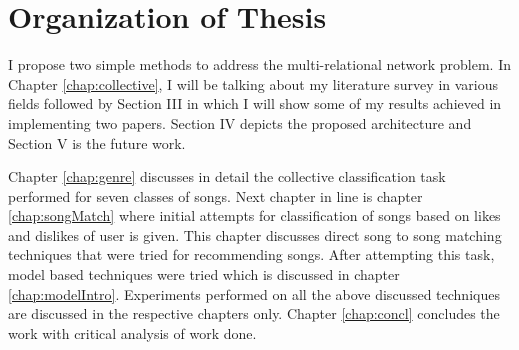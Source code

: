 \section{Organization of Thesis}
I propose two simple methods to address the multi-relational network problem. In Chapter \ref{chap:collective}, I will be talking about my literature survey in various fields followed by Section III in which I will show some of my results achieved in implementing two papers. Section IV depicts the proposed architecture and Section V is the future work.

Chapter \ref{chap:genre} discusses in detail the collective classification task performed for seven classes of songs. Next chapter in line is chapter \ref{chap:songMatch} where initial attempts for classification of songs based on likes and dislikes of user is given. This chapter discusses direct song to song matching techniques that were tried for recommending songs. After attempting this task, model based techniques were tried which is discussed in chapter \ref{chap:modelIntro}. Experiments performed on all the above discussed techniques are discussed in the respective chapters only. Chapter \ref{chap:concl} concludes the work with critical analysis of work done.